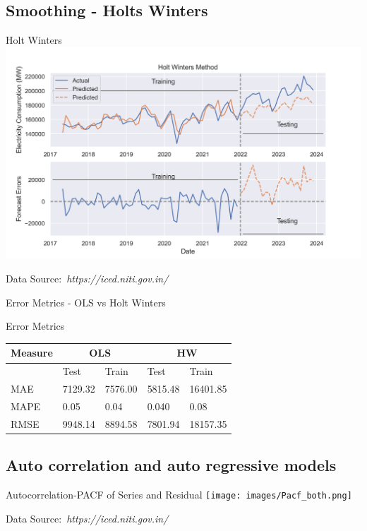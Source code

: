 \documentclass{beamer}
\newcommand{\credit}[1]{\par\hfill \footnotesize Data Source:~\itshape#1}
\begin{document}
\subsection{Smoothing - Holts Winters }
\begin{frame}{Holt Winters}
\centering
\includegraphics[width=\linewidth]{images/Holt Winters.png}
\credit{https://iced.niti.gov.in/}
\end{frame}

\begin{frame}{Error Metrics - OLS vs Holt Winters }
\centering
 
  \begin{block}{Error Metrics}
   
    \centering
       \begin{tabular}{l|l|l|l|l}
\toprule
 Measure & \multicolumn{2}{c}{OLS}  & \multicolumn{2}{c}{HW} \\
 
 \midrule
 & Test & Train &Test&Train\\
\midrule
MAE & 7129.32 & 7576.00 &5815.48&16401.85\\
\midrule
MAPE & 0.05 & 0.04 &0.040 & 0.08\\
\midrule
RMSE & 9948.14 & 8894.58& 7801.94 & 18157.35 \\
\bottomrule
\end{tabular}
   
  \end{block}
\end{frame}

\subsection{Auto correlation and auto regressive models}
\begin{frame}{Autocorrelation-PACF of Series and Residual}
\centering
\texttt{[image: images/Pacf\_both.png]}
\credit{https://iced.niti.gov.in/}
\end{frame}
\end{document}
